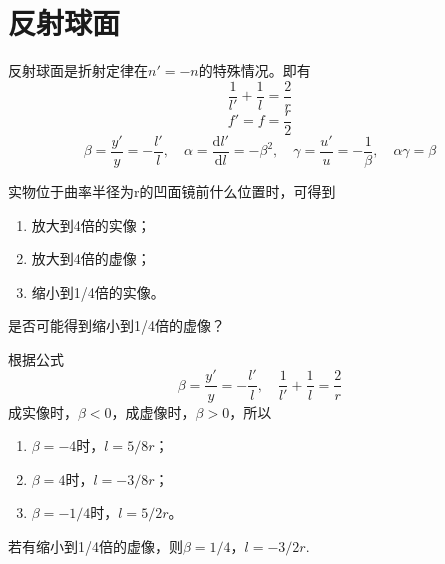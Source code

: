 \documentclass[cn,10pt,chinesefont=founder,math=mtpro2,cite=super,toc=onecol,twoside,openany]{elegantbook}
\begin{document}
\section{反射球面}
反射球面是折射定律在$n'=-n$的特殊情况。即有
\begin{equation}
\frac{1}{l'}+\frac{1}{l}=\frac{2}{r}
\end{equation}
\begin{equation}
f'=f=\frac{r}{2}
\end{equation}
\begin{equation}
\beta=\frac{y'}{y}=-\frac{l'}{l},\quad
\alpha=\frac{\mathrm{d}l'}{\mathrm{d}l}=-\beta^2,\quad
\gamma=\frac{u'}{u}=-\frac{1}{\beta},\quad
\alpha\gamma=\beta
\end{equation}

\begin{problem}
	实物位于曲率半径为r的凹面镜前什么位置时，可得到
	\begin{enumerate}
		\item 放大到4倍的实像；
		\item 放大到4倍的虚像；
		\item 缩小到1/4倍的实像。
	\end{enumerate}
	是否可能得到缩小到1/4倍的虚像？
\end{problem}
\begin{solution}
根据公式
\begin{equation}
\beta=\frac{y'}{y}=-\frac{l'}{l},\quad \frac{1}{l'}+\frac{1}{l}=\frac{2}{r} \nonumber
\end{equation}
成实像时，$\beta<0$，成虚像时，$\beta>0$，所以
\begin{enumerate}
	\item $\beta=-4$时，$l=5/8r$；
	\item $\beta=4$时，$l=-3/8r$；
	\item $\beta=-1/4$时，$l=5/2r$。
\end{enumerate}
若有缩小到1/4倍的虚像，则$\beta=1/4$，$l=-3/2r$.
\end{solution}
\end{document}
